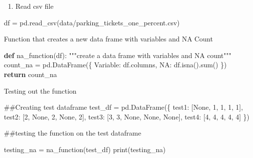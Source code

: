 \documentclass[
]{article}
\newenvironment{Shaded}{\begin{snugshade}}{\end{snugshade}}
\newcommand{\BuiltInTok}[1]{\textcolor[rgb]{0.00,0.23,0.31}{#1}}
\newcommand{\CommentTok}[1]{\textcolor[rgb]{0.37,0.37,0.37}{#1}}
\newcommand{\ControlFlowTok}[1]{\textcolor[rgb]{0.00,0.23,0.31}{\textbf{#1}}}
\newcommand{\DecValTok}[1]{\textcolor[rgb]{0.68,0.00,0.00}{#1}}
\newcommand{\KeywordTok}[1]{\textcolor[rgb]{0.00,0.23,0.31}{\textbf{#1}}}
\newcommand{\NormalTok}[1]{\textcolor[rgb]{0.00,0.23,0.31}{#1}}
\newcommand{\OperatorTok}[1]{\textcolor[rgb]{0.37,0.37,0.37}{#1}}
\newcommand{\StringTok}[1]{\textcolor[rgb]{0.13,0.47,0.30}{#1}}
\newcommand{\VariableTok}[1]{\textcolor[rgb]{0.07,0.07,0.07}{#1}}
\providecommand{\tightlist}{%
  \setlength{\itemsep}{0pt}\setlength{\parskip}{0pt}}\usepackage{longtable,booktabs,array}
\begin{document}
\begin{enumerate}
\def\labelenumi{\arabic{enumi}.}
\tightlist
\item
  Read csv file
\end{enumerate}

\begin{Shaded}
\begin{Highlighting}[]
\NormalTok{df }\OperatorTok{=}\NormalTok{ pd.read\_csv(}\StringTok{\textquotesingle{}data/parking\_tickets\_one\_percent.csv\textquotesingle{}}\NormalTok{)}
\end{Highlighting}
\end{Shaded}

Function that creates a new data frame with variables and NA Count

\begin{Shaded}
\begin{Highlighting}[]
\KeywordTok{def}\NormalTok{ na\_function(df):}
    \CommentTok{"""create a data frame with variables and NA count"""}
\NormalTok{    count\_na }\OperatorTok{=}\NormalTok{ pd.DataFrame(\{}
        \StringTok{\textquotesingle{}Variable\textquotesingle{}}\NormalTok{: df.columns,}
        \StringTok{\textquotesingle{}NA\textquotesingle{}}\NormalTok{: df.isna().}\BuiltInTok{sum}\NormalTok{()}
\NormalTok{    \})}
    \ControlFlowTok{return}\NormalTok{ count\_na}
\end{Highlighting}
\end{Shaded}

Testing out the function

\begin{Shaded}
\begin{Highlighting}[]
\CommentTok{\#\#Creating test dataframe}
\NormalTok{test\_df }\OperatorTok{=}\NormalTok{ pd.DataFrame(\{}
    \StringTok{\textquotesingle{}test1\textquotesingle{}}\NormalTok{: [}\VariableTok{None}\NormalTok{, }\DecValTok{1}\NormalTok{, }\DecValTok{1}\NormalTok{, }\DecValTok{1}\NormalTok{, }\DecValTok{1}\NormalTok{],}
    \StringTok{\textquotesingle{}test2\textquotesingle{}}\NormalTok{: [}\DecValTok{2}\NormalTok{, }\VariableTok{None}\NormalTok{, }\DecValTok{2}\NormalTok{, }\VariableTok{None}\NormalTok{, }\DecValTok{2}\NormalTok{],}
    \StringTok{\textquotesingle{}test3\textquotesingle{}}\NormalTok{: [}\DecValTok{3}\NormalTok{, }\DecValTok{3}\NormalTok{, }\VariableTok{None}\NormalTok{, }\VariableTok{None}\NormalTok{, }\VariableTok{None}\NormalTok{],}
    \StringTok{\textquotesingle{}test4\textquotesingle{}}\NormalTok{: [}\DecValTok{4}\NormalTok{, }\DecValTok{4}\NormalTok{, }\DecValTok{4}\NormalTok{, }\DecValTok{4}\NormalTok{, }\DecValTok{4}\NormalTok{]}
\NormalTok{\})}

\CommentTok{\#\#testing the function on the test dataframe}

\NormalTok{testing\_na }\OperatorTok{=}\NormalTok{ na\_function(test\_df)}
\BuiltInTok{print}\NormalTok{(testing\_na)}
\end{Highlighting}
\end{Shaded}
\end{document}
